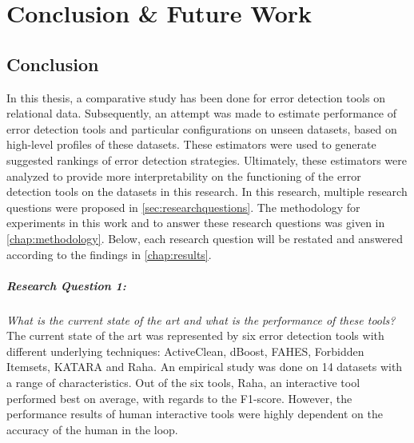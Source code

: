 \chapter{Conclusion \& Future Work}
\label{chap:conclusion}
\section*{Conclusion}
In this thesis, a comparative study has been done for error detection tools on relational data. Subsequently, an attempt was made to estimate performance of error detection tools and particular configurations on unseen datasets, based on high-level profiles of these datasets. These estimators were used to generate suggested rankings of error detection strategies. Ultimately, these estimators were analyzed to provide more interpretability on the functioning of the error detection tools on the datasets in this research.
In this research, multiple research questions were proposed in \autoref{sec:researchquestions}. The methodology for experiments in this work and to answer these research questions was given in \autoref{chap:methodology}. Below, each research question will be restated and answered according to the findings in \autoref{chap:results}.

\paragraph{Research Question 1:} \textit{What is the current state of the art and what is the performance of these tools?}
~\\The current state of the art was represented by six error detection tools with different underlying techniques: ActiveClean, dBoost, FAHES, Forbidden Itemsets, KATARA and Raha. An empirical study was done on 14 datasets with a range of characteristics. Out of the six tools, Raha, an interactive tool performed best on average, with regards to the F1-score. However, the performance results of human interactive tools were highly dependent on the accuracy of the human in the loop.

